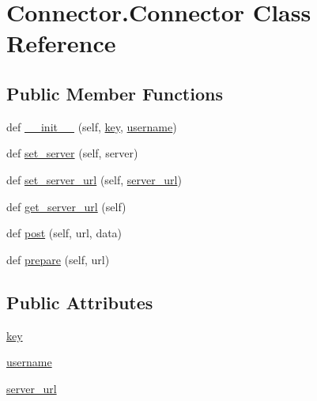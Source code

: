 \hypertarget{class_connector_1_1_connector}{}\section{Connector.\+Connector Class Reference}
\label{class_connector_1_1_connector}
\subsection*{Public Member Functions}
\begin{DoxyCompactItemize}
\item 
def \hyperlink{class_connector_1_1_connector_a32f8a0c9743ebf1c7dc1e6456d98118b}{\+\_\+\+\_\+init\+\_\+\+\_\+} (self, \hyperlink{class_connector_1_1_connector_a68fc67f443c908108b479c2e0827c321}{key}, \hyperlink{class_connector_1_1_connector_a9c6f760e8cf57a5392c54783046f156f}{username})
\item 
def \hyperlink{class_connector_1_1_connector_ac0d10fd60e38dd5eb3758575118c6680}{set\+\_\+server} (self, server)
\item 
def \hyperlink{class_connector_1_1_connector_a4bd973d97cc89b0ebed4b72e1e996b18}{set\+\_\+server\+\_\+url} (self, \hyperlink{class_connector_1_1_connector_aee36fe395f89b6b4712cfc99f273bfa1}{server\+\_\+url})
\item 
def \hyperlink{class_connector_1_1_connector_a2216cb3f761ca30ffee9c1cc9583e7b3}{get\+\_\+server\+\_\+url} (self)
\item 
def \hyperlink{class_connector_1_1_connector_af97a62f3ee2ac6f649251e2bbc14c32d}{post} (self, url, data)
\item 
def \hyperlink{class_connector_1_1_connector_a8dcd72145102381f203c0c2f8ea457d6}{prepare} (self, url)
\end{DoxyCompactItemize}
\subsection*{Public Attributes}
\begin{DoxyCompactItemize}
\item 
\hyperlink{class_connector_1_1_connector_a0130afa02e9d0d734fe31122d4f33f9d}{key}
\item 
\hyperlink{class_connector_1_1_connector_ace64a2a0c54ce06f70ee2b444d2e6f9d}{username}
\item 
\hyperlink{class_connector_1_1_connector_a0d600c0a34c2393eb6c5cbf80c5110d6}{server\+\_\+url}
\end{DoxyCompactItemize}
